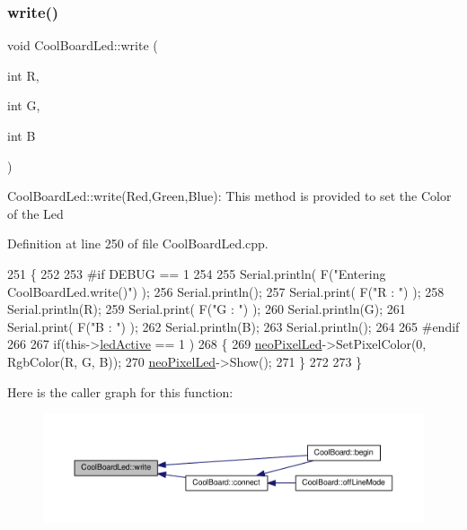 \subsubsection{\texorpdfstring{write()}{write()}}
{\footnotesize\ttfamily void Cool\+Board\+Led\+::write (\begin{DoxyParamCaption}\item[{int}]{R,  }\item[{int}]{G,  }\item[{int}]{B }\end{DoxyParamCaption})}

Cool\+Board\+Led\+::write(\+Red,\+Green,\+Blue)\+: This method is provided to set the Color of the Led 

Definition at line 250 of file Cool\+Board\+Led.\+cpp.


\begin{DoxyCode}
251 \{
252 
253 \textcolor{preprocessor}{#if DEBUG == 1}
254 
255     Serial.println( F(\textcolor{stringliteral}{"Entering CoolBoardLed.write()"}) );
256     Serial.println();
257     Serial.print( F(\textcolor{stringliteral}{"R : "}) );
258     Serial.println(R);
259     Serial.print( F(\textcolor{stringliteral}{"G : "}) );
260     Serial.println(G);
261     Serial.print( F(\textcolor{stringliteral}{"B : "}) );
262     Serial.println(B);
263     Serial.println();   
264 
265 \textcolor{preprocessor}{#endif}
266 
267     \textcolor{keywordflow}{if}(this->\hyperlink{class_cool_board_led_aadd04d2ecf123247718d77f42fba7f08}{ledActive} == 1 )
268     \{
269         \hyperlink{class_cool_board_led_ac2c13fa462a010cd9242bf297c013923}{neoPixelLed}->SetPixelColor(0, RgbColor(R, G, B));
270         \hyperlink{class_cool_board_led_ac2c13fa462a010cd9242bf297c013923}{neoPixelLed}->Show();
271     \}
272 
273 \}
\end{DoxyCode}
Here is the caller graph for this function\+:\nopagebreak
\begin{figure}[H]
\begin{center}
\leavevmode
\includegraphics[width=350pt]{de/dc0/class_cool_board_led_a30fadd4cbec17ceea428bf7a32207e87_icgraph}
\end{center}
\end{figure}



